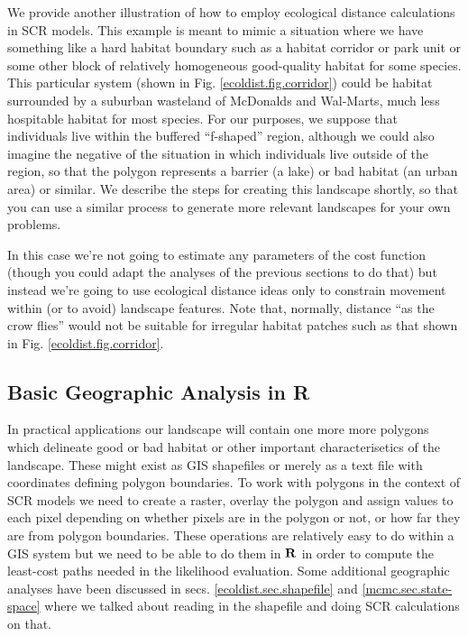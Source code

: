 We provide another illustration of how to employ ecological distance
calculations in SCR models. This example is meant to mimic
a situation where we have something like a hard habitat boundary
such as a habitat corridor or park unit or some other block
of relatively homogeneous good-quality habitat for some species. This
particular system (shown in Fig. \ref{ecoldist.fig.corridor}) could
be habitat surrounded by a suburban wasteland of McDonalds and
Wal-Marts, much less hospitable habitat for most species.  For our
purposes, we suppose that individuals live within the buffered
``f-shaped''
region, although we could also imagine the negative of the
situation in which individuals live outside of the region, so that the
polygon represents a barrier (a lake) or bad habitat (an urban area)
or similar.  We describe the steps for creating this landscape
shortly, so that you can use a similar process to generate more
relevant landscapes for your own problems.

In this case we're not going to estimate any parameters of the cost
function (though you could adapt the analyses of the previous sections
to do that) but instead we're going to use ecological
distance ideas only to constrain movement within (or to avoid)
landscape features. Note that, normally, distance ``as the crow
flies'' would not be suitable for irregular habitat patches such as
that shown in Fig. \ref{ecoldist.fig.corridor}.


\subsection{Basic Geographic Analysis in R}

In practical applications our landscape will contain one more more
polygons which delineate good or bad habitat or other important
characterisetics of the landscape.  These might exist as GIS
shapefiles or merely as a text file with coordinates defining polygon
boundaries. To work with polygons in the context of SCR models we need
to create a raster, overlay the polygon and assign values to each pixel
depending on whether pixels are in the polygon or not, or how far they
are from polygon boundaries. These operations are relatively easy to
do within a GIS system but we need to be able to do them in ${\bf R}$
in order to compute the least-cost paths needed in the likelihood
evaluation. Some additional geographic analyses have been discussed in
secs. \ref{ecoldist.sec.shapefile} and \ref{mcmc.sec.state-space}
where we talked about reading in the shapefile and doing SCR calculations
on that.

